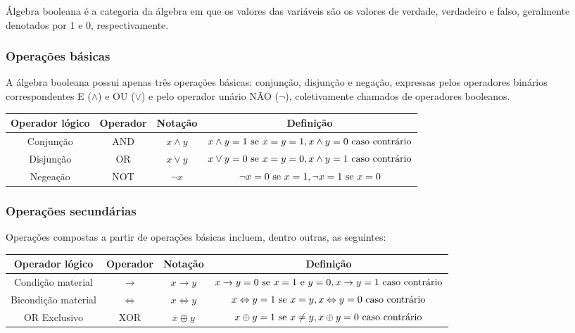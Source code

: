Álgebra booleana é a categoria da álgebra em que os valores das variáveis são os valores de verdade, verdadeiro e falso, geralmente denotados por 1 e 0, respectivamente.

\subsubsection{Operações básicas}
A álgebra booleana possui apenas três operações básicas: conjunção, disjunção e negação, expressas pelos operadores binários correspondentes E ($\land$) e OU ($\lor$) e pelo operador unário NÃO ($\neg$), coletivamente chamados de operadores booleanos.

\begin{center}
    \begin{tabular}{c|c|c|c}
        Operador lógico & Operador & Notação & Definição\\
        \hline
        Conjunção & AND & $x \land y$  & $x \land y = 1 \textnormal{ se } x=y=1,x \land y = 0 \textnormal{ caso contrário}$ \\
        Disjunção & OR & $x \lor y$ & $x \lor y = 0 \textnormal{ se } x=y=0,x \land y = 1 \textnormal{ caso contrário}$  \\
        Negeação & NOT & $\neg x$ & $\neg x = 0 \textnormal{ se } x=1,\neg x  = 1 \textnormal{ se }x=0$ 
    \end{tabular}
    
\end{center}

\subsubsection{Operações secundárias}
Operações compostas a partir de operações básicas incluem, dentro outras, as seguintes:
\begin{center}
    \begin{tabular}{c|c|c|c}
        Operador lógico & Operador & Notação & Definição\\
        \hline
        Condição material & $\rightarrow$ & $x \rightarrow y$ & $x \rightarrow y = 0 \textnormal{ se } x = 1 \textnormal{ e } y = 0,x \rightarrow y = 1 \textnormal{ caso contrário}$ \\
        Bicondição material & $\Leftrightarrow$ & $x \Leftrightarrow y$ &$x \Leftrightarrow y = 1 \textnormal{ se } x=y,x \Leftrightarrow y = 0 \textnormal{ caso contrário}$ \\
        OR Exclusivo & XOR & $x \oplus y$  &$x \oplus y = 1 \textnormal{ se } x\neq y,x \oplus y = 0 \textnormal{ caso contrário}$
    \end{tabular}
\end{center}

